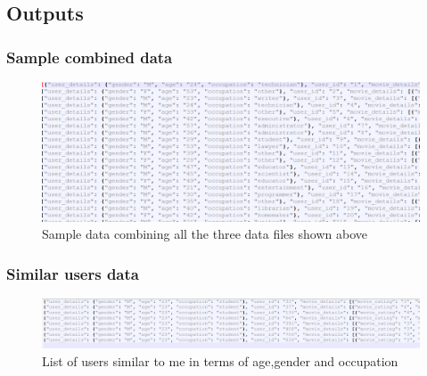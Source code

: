 \subsection{Outputs}

\subsubsection{Sample combined data}
\begin{figure}[ht]    
    \begin{center}
        \includegraphics[scale=0.4]{sample_combined.png}
        \caption{Sample data combining all the three data files shown above}
        \label{Samplelist4}
    \end{center}
\end{figure}
\newpage

\subsubsection{Similar users data}
\begin{figure}[ht]    
    \begin{center}
        \includegraphics[scale=0.36]{similarusers.png}
        \caption{List of users similar to me in terms of age,gender and occupation}
        \label{Samplelist5}
    \end{center}
\end{figure}
\newpage
